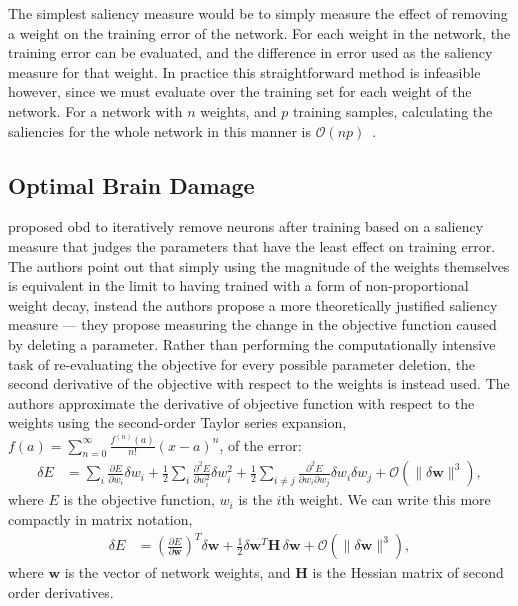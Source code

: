 \documentclass[thesis]{subfiles}
\begin{document}
	The simplest saliency measure would be to simply measure the effect of removing a weight on the training error of the network. For each weight in the network, the training error can be evaluated, and the difference in error used as the saliency measure for that weight. In practice this straightforward method is infeasible however, since we must evaluate over the training set for each weight of the network. For a network with $n$ weights, and $p$ training samples, calculating the saliencies for the whole network in this manner is $\mathcal{O}(np)$~\citep{hanson1989comparing}.
	
	\subsection{Optimal Brain Damage}
    \citet{lecun1989optimal} proposed \gls{obd} to iteratively remove neurons after training based on a saliency measure that judges the parameters that have the least effect on training error. The authors point out that simply using the magnitude of the weights themselves is equivalent in the limit to having trained with a form of non-proportional weight decay, instead the authors propose a more theoretically justified saliency measure --- they propose measuring the change in the objective function caused by deleting a parameter. Rather than performing the computationally intensive task of re-evaluating the objective for every possible parameter deletion, the second derivative of the objective with respect to the weights is instead used. The authors approximate the derivative of objective function with respect to the weights using the second-order Taylor series expansion, $f(a) = \sum_{n=0}^\infty \frac{f^{(n)}(a)}{n!} (x - a)^n$, of the error:
    \begin{align}
       \delta E &= \sum_i \frac{\partial E}{\partial w_i} \delta w_i + \frac{1}{2} \sum_i \frac{\partial^2 E}{\partial w_i^2} \delta w_i^2 + \frac{1}{2} \sum_{i\neq j} \frac{\partial^2 E}{\partial w_i \partial w_j} \delta w_i \delta w_j +\mathcal{O}(\|\delta \mathbf{w}\|^3),
    \end{align}
    where $E$ is the objective function, $w_i$ is the $i$th weight. We can write this more compactly in matrix notation,
    \begin{align}
       \delta E &= \left( \frac{\partial E}{\partial \mathbf{w}} \right)^T \delta \mathbf{w} +\frac{1}{2}\delta \mathbf{w}^T \mathbf{H}\, \delta \mathbf{w} +\mathcal{O}(\|\delta \mathbf{w}\|^3),
    \end{align}
	where $\mathbf{w}$ is the vector of network weights, and %
	$\mathbf{H}$ is the Hessian matrix of second order derivatives. 
\end{document}
